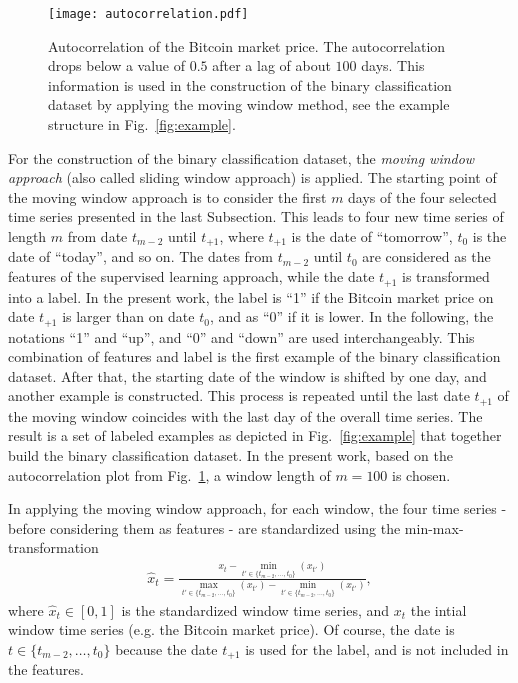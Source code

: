 \begin{figure}[h!]
	\centering
	\texttt{[image: autocorrelation.pdf]}
    \caption{Autocorrelation of the Bitcoin market price. The autocorrelation drops below a value of $0.5$ after a lag of about $100$ days. This information is used in the construction of the binary classification dataset by applying the moving window method, see the example structure in Fig.~\ref{fig:example}.}
    \label{fig:autocorrelation}
\end{figure}

For the construction of the binary classification dataset, the \textit{moving window approach} (also called sliding window approach) is applied. The starting point of the moving window approach is to consider the first $m$ days of the four selected time series presented in the last Subsection. This leads to four new time series of length $m$ from date $t_{m-2}$ until $t_{+1}$, where $t_{+1}$ is the date of \enquote{tomorrow}, $t_0$ is the date of \enquote{today}, and so on. The dates from $t_{m-2}$ until $t_{0}$ are considered as the features of the supervised learning approach, while the date $t_{+1}$ is transformed into a label. In the present work, the label is \enquote{1} if the Bitcoin market price on date $t_{+1}$ is larger than on date $t_0$, and as \enquote{0} if it is lower. In the following, the notations \enquote{1} and \enquote{up}, and \enquote{0} and \enquote{down} are used interchangeably. This combination of features and label is the first example of the binary classification dataset. After that, the starting date of the window is shifted by one day, and another example is constructed. This process is repeated until the last date $t_{+1}$ of the moving window coincides with the last day of the overall time series. The result is a set of labeled examples as depicted in Fig.~\ref{fig:example} that together build the binary classification dataset. In the present work, based on the autocorrelation plot from Fig.~\ref{fig:autocorrelation}, a window length of $m=100$ is chosen. 

In applying the moving window approach, for each window, the four time series - before considering them as features - are standardized using the min-max-transformation
\begin{align*}
	\hat{x}_t = \frac{x_t - \min_{t' \in \{t_{m-2}, \dots ,t_{0}\}}(x_{t'})}{\max_{t' \in \{t_{m-2}, \dots ,t_{0}\}}(x_{t'}) - \min_{t' \in \{t_{m-2}, \dots ,t_{0}\}}(x_{t'})},
\end{align*}
where $\hat{x}_t \in [0,1]$ is the standardized window time series, and $x_t$ the intial window time series (e.g. the Bitcoin market price). Of course, the date is $t \in \{t_{m-2}, \dots ,t_{0}\}$ because the date $t_{+1}$ is used for the label, and is not included in the features. \\

